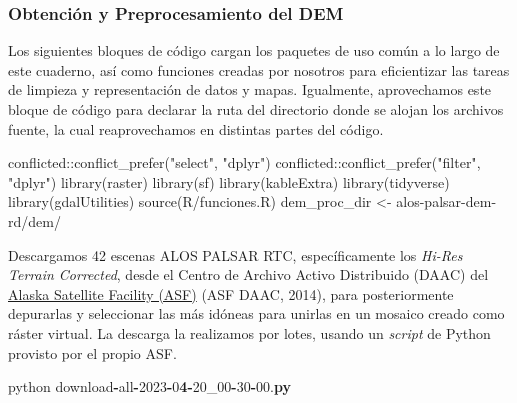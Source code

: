 \documentclass[spanish]{article}
\newenvironment{Shaded}{\begin{snugshade}}{\end{snugshade}}
\newcommand{\BuiltInTok}[1]{#1}
\newcommand{\DecValTok}[1]{\textcolor[rgb]{0.00,0.00,0.81}{#1}}
\newcommand{\ErrorTok}[1]{\textcolor[rgb]{0.64,0.00,0.00}{\textbf{#1}}}
\newcommand{\FloatTok}[1]{\textcolor[rgb]{0.00,0.00,0.81}{#1}}
\newcommand{\FunctionTok}[1]{\textcolor[rgb]{0.00,0.00,0.00}{#1}}
\newcommand{\NormalTok}[1]{#1}
\newcommand{\OperatorTok}[1]{\textcolor[rgb]{0.81,0.36,0.00}{\textbf{#1}}}
\newcommand{\OtherTok}[1]{\textcolor[rgb]{0.56,0.35,0.01}{#1}}
\newcommand{\SpecialCharTok}[1]{\textcolor[rgb]{0.00,0.00,0.00}{#1}}
\newcommand{\StringTok}[1]{\textcolor[rgb]{0.31,0.60,0.02}{#1}}
\begin{document}
\hypertarget{obtenciuxf3n-y-preprocesamiento-del-dem-1}{%
\subsubsection{Obtención y Preprocesamiento del
DEM}\label{obtenciuxf3n-y-preprocesamiento-del-dem-1}}

Los siguientes bloques de código cargan los paquetes de uso común a lo
largo de este cuaderno, así como funciones creadas por nosotros para
eficientizar las tareas de limpieza y representación de datos y mapas.
Igualmente, aprovechamos este bloque de código para declarar la ruta del
directorio donde se alojan los archivos fuente, la cual reaprovechamos
en distintas partes del código.

\begin{Shaded}
\begin{Highlighting}[]
\NormalTok{conflicted}\SpecialCharTok{::}\FunctionTok{conflict\_prefer}\NormalTok{(}\StringTok{"select"}\NormalTok{, }\StringTok{"dplyr"}\NormalTok{)}
\NormalTok{conflicted}\SpecialCharTok{::}\FunctionTok{conflict\_prefer}\NormalTok{(}\StringTok{"filter"}\NormalTok{, }\StringTok{"dplyr"}\NormalTok{)}
\FunctionTok{library}\NormalTok{(raster)}
\FunctionTok{library}\NormalTok{(sf)}
\FunctionTok{library}\NormalTok{(kableExtra)}
\FunctionTok{library}\NormalTok{(tidyverse)}
\FunctionTok{library}\NormalTok{(gdalUtilities)}
\FunctionTok{source}\NormalTok{(}\StringTok{\textquotesingle{}R/funciones.R\textquotesingle{}}\NormalTok{)}
\NormalTok{dem\_proc\_dir }\OtherTok{\textless{}{-}} \StringTok{\textquotesingle{}alos{-}palsar{-}dem{-}rd/dem/\textquotesingle{}}
\end{Highlighting}
\end{Shaded}

Descargamos 42 escenas ALOS PALSAR RTC, específicamente los \emph{Hi-Res
Terrain Corrected}, desde el Centro de Archivo Activo Distribuido (DAAC)
del \href{https://asf.alaska.edu/}{Alaska Satellite Facility (ASF)} (ASF
DAAC, 2014), para posteriormente depurarlas y seleccionar las más
idóneas para unirlas en un mosaico creado como ráster virtual. La
descarga la realizamos por lotes, usando un \emph{script} de Python
provisto por el propio ASF.

\begin{Shaded}
\begin{Highlighting}[]
\NormalTok{python download}\OperatorTok{{-}}\BuiltInTok{all}\OperatorTok{{-}}\DecValTok{2023}\OperatorTok{{-}}\DecValTok{0}\ErrorTok{4}\OperatorTok{{-}}\DecValTok{20\_00}\OperatorTok{{-}}\DecValTok{30}\OperatorTok{{-}}\FloatTok{00.}\ErrorTok{py}
\end{Highlighting}
\end{Shaded}
\end{document}
